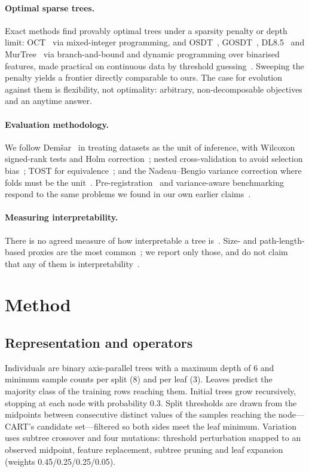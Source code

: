 \documentclass[sigconf,review,anonymous]{acmart}
\begin{document}
\paragraph{Optimal sparse trees.} Exact methods find provably optimal trees under a
sparsity penalty or depth limit: OCT~\cite{bertsimas2017} via mixed-integer programming,
and OSDT~\cite{hu2019}, GOSDT~\cite{lin2020}, DL8.5~\cite{aglin2020} and
MurTree~\cite{demirovic2022} via branch-and-bound and dynamic programming over binarised
features, made practical on continuous data by threshold guessing~\cite{mctavish2022}.
Sweeping the penalty yields a frontier directly comparable to ours. The case for
evolution against them is flexibility, not optimality: arbitrary, non-decomposable
objectives and an anytime answer.

\paragraph{Evaluation methodology.} We follow Dem\v{s}ar~\cite{demsar2006} in treating
datasets as the unit of inference, with Wilcoxon signed-rank tests and Holm
correction~\cite{holm1979}; nested cross-validation to avoid selection
bias~\cite{varma2006,cawley2010}; TOST for equivalence~\cite{schuirmann1987}; and the
Nadeau--Bengio variance correction where folds must be the unit~\cite{nadeau2003}.
Pre-registration~\cite{nosek2018} and variance-aware benchmarking~\cite{bouthillier2021}
respond to the same problems we found in our own earlier claims~\cite{lipton2019}.

\paragraph{Measuring interpretability.} There is no agreed measure of how interpretable a
tree is~\cite{lipton2018,doshivelez2017}. Size- and path-length-based proxies are the most
common~\cite{freitas2014,piltaver2016}; we report only those, and do not claim that any of
them is interpretability~\cite{rudin2019}.

\section{Method}

\subsection{Representation and operators}
Individuals are binary axis-parallel trees with a maximum depth of 6 and minimum sample
counts per split (8) and per leaf (3). Leaves predict the majority class of the
training rows reaching them. Initial trees grow recursively, stopping at each node with
probability 0.3. Split thresholds are drawn from the midpoints between consecutive
distinct values of the samples reaching the node---CART's candidate set---filtered so
both sides meet the leaf minimum. Variation uses subtree crossover and four mutations:
threshold perturbation snapped to an observed midpoint, feature replacement, subtree
pruning and leaf expansion (weights 0.45/0.25/0.25/0.05).
\end{document}
